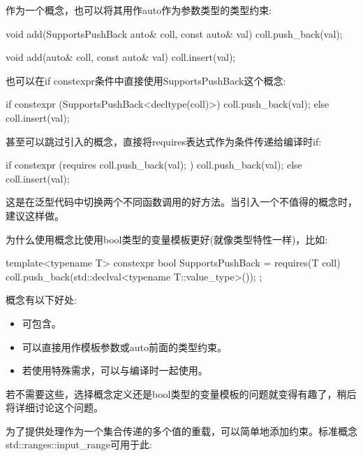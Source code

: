 作为一个概念，也可以将其用作auto作为参数类型的类型约束:

\begin{cpp}
void add(SupportsPushBack auto& coll, const auto& val)
{
	coll.push_back(val);
}

void add(auto& coll, const auto& val)
{
	coll.insert(val);
}
\end{cpp}


也可以在if constexpr条件中直接使用SupportsPushBack这个概念:

\begin{cpp}
if constexpr (SupportsPushBack<decltype(coll)>) {
	coll.push_back(val);
}
else {
	coll.insert(val);
}
\end{cpp}


甚至可以跳过引入的概念，直接将requires表达式作为条件传递给编译时if:

\begin{cpp}
if constexpr (requires { coll.push_back(val); }) {
	coll.push_back(val);
}
else {
	coll.insert(val);
}
\end{cpp}

这是在泛型代码中切换两个不同函数调用的好方法。当引入一个不值得的概念时，建议这样做。


为什么使用概念比使用bool类型的变量模板更好(就像类型特性一样)，比如:

\begin{cpp}
template<typename T>
constexpr bool SupportsPushBack = requires(T coll) {
	coll.push_back(std::declval<typename T::value_type>());
};
\end{cpp}

概念有以下好处:

\begin{itemize}
\item
可包含。

\item
可以直接用作模板参数或auto前面的类型约束。

\item
若使用特殊需求，可以与编译时一起使用。
\end{itemize}

若不需要这些，选择概念定义还是bool类型的变量模板的问题就变得有趣了，稍后将详细讨论这个问题。


为了提供处理作为一个集合传递的多个值的重载，可以简单地添加约束。标准概念std::ranges::input\_range可用于此:


